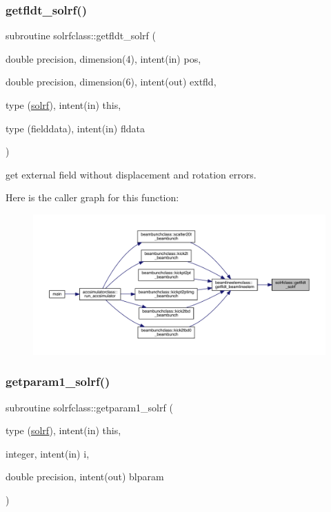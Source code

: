 \subsubsection{\texorpdfstring{getfldt\_solrf()}{getfldt\_solrf()}}
{\footnotesize\ttfamily subroutine solrfclass\+::getfldt\+\_\+solrf (\begin{DoxyParamCaption}\item[{double precision, dimension(4), intent(in)}]{pos,  }\item[{double precision, dimension(6), intent(out)}]{extfld,  }\item[{type (\mbox{\hyperlink{namespacesolrfclass_structsolrfclass_1_1solrf}{solrf}}), intent(in)}]{this,  }\item[{type (fielddata), intent(in)}]{fldata }\end{DoxyParamCaption})}



get external field without displacement and rotation errors. 

Here is the caller graph for this function\+:\nopagebreak
\begin{figure}[H]
\begin{center}
\leavevmode
\includegraphics[width=350pt]{namespacesolrfclass_ac164c5b7477e8ec4278009bd85cd4338_icgraph}
\end{center}
\end{figure}
\mbox{\label{namespacesolrfclass_af623613497d4af2070e81c255374535e}} 
\subsubsection{\texorpdfstring{getparam1\_solrf()}{getparam1\_solrf()}}
{\footnotesize\ttfamily subroutine solrfclass\+::getparam1\+\_\+solrf (\begin{DoxyParamCaption}\item[{type (\mbox{\hyperlink{namespacesolrfclass_structsolrfclass_1_1solrf}{solrf}}), intent(in)}]{this,  }\item[{integer, intent(in)}]{i,  }\item[{double precision, intent(out)}]{blparam }\end{DoxyParamCaption})}

